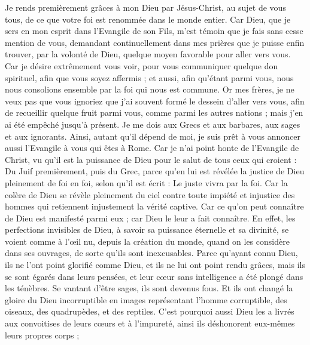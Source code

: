 \begin{multicols}{2}
Je rends premièrement grâces à mon Dieu par Jésus-Christ, au sujet de vous tous, de ce que votre foi est renommée dans le monde entier.
Car Dieu, que je sers en mon esprit dans l'Evangile de son Fils, m'est témoin que je fais sans cesse mention de vous,
demandant continuellement dans mes prières que je puisse enfin trouver, par la volonté de Dieu, quelque moyen favorable pour aller vers vous.
Car je désire extrêmement vous voir, pour vous communiquer quelque don spirituel, afin que vous soyez affermis ;
et aussi, afin qu'étant parmi vous, nous nous consolions ensemble par la foi qui nous est commune.
Or mes frères, je ne veux pas que vous ignoriez que j’ai souvent formé le dessein d'aller vers vous, afin de recueillir quelque fruit parmi vous, comme parmi les autres nations ; mais j'en ai été empêché jusqu'à présent.
Je me dois aux Grecs et aux barbares, aux sages et aux ignorants.
Ainsi, autant qu’il dépend de moi, je suis prêt à vous annoncer aussi l'Evangile à vous qui êtes à Rome.
Car je n'ai point honte de l'Evangile de Christ, vu qu'il est la puissance de Dieu pour le salut de tous ceux qui croient : Du Juif premièrement, puis du Grec,
parce qu’en lui est révélée la justice de Dieu pleinement de foi en foi, selon qu'il est écrit : Le juste vivra par la foi.
Car la colère de Dieu se révèle pleinement du ciel contre toute impiété et injustice des hommes qui retiennent injustement la vérité captive.
Car ce qu’on peut connaître de Dieu est manifesté parmi eux ; car Dieu le leur a fait connaître.
En effet, les perfections invisibles de Dieu, à savoir sa puissance éternelle et sa divinité, se voient comme à l’œil nu, depuis la création du monde, quand on les considère dans ses ouvrages, de sorte qu'ils sont inexcusables.
Parce qu'ayant connu Dieu, ils ne l'ont point glorifié comme Dieu, et ils ne lui ont point rendu grâces, mais ils se sont égarés dans leurs pensées, et leur cœur sans intelligence a été plongé dans les ténèbres.
Se vantant d’être sages, ils sont devenus fous.
Et ils ont changé la gloire du Dieu incorruptible en images représentant l'homme corruptible, des oiseaux, des quadrupèdes, et des reptiles.
C'est pourquoi aussi Dieu les a livrés aux convoitises de leurs cœurs et à l’impureté, ainsi ils déshonorent eux-mêmes leurs propres corps ;

\end{multicols}
